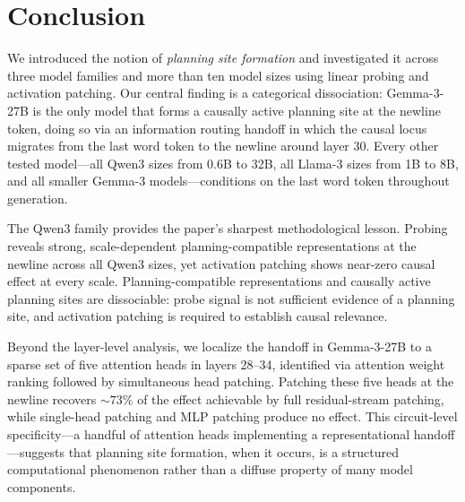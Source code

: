 \documentclass{article}
\begin{document}


\section{Conclusion}

We introduced the notion of \textit{planning site formation} and investigated it across three model families and more than ten model sizes using linear probing and activation patching. Our central finding is a categorical dissociation: Gemma-3-27B is the only model that forms a causally active planning site at the newline token, doing so via an information routing handoff in which the causal locus migrates from the last word token to the newline around layer 30. Every other tested model---all Qwen3 sizes from 0.6B to 32B, all Llama-3 sizes from 1B to 8B, and all smaller Gemma-3 models---conditions on the last word token throughout generation.

The Qwen3 family provides the paper's sharpest methodological lesson. Probing reveals strong, scale-dependent planning-compatible representations at the newline across all Qwen3 sizes, yet activation patching shows near-zero causal effect at every scale. Planning-compatible representations and causally active planning sites are dissociable: probe signal is not sufficient evidence of a planning site, and activation patching is required to establish causal relevance.

Beyond the layer-level analysis, we localize the handoff in Gemma-3-27B to a sparse set of five attention heads in layers 28--34, identified via attention weight ranking followed by simultaneous head patching. Patching these five heads at the newline recovers ${\sim}73\%$ of the effect achievable by full residual-stream patching, while single-head patching and MLP patching produce no effect. This circuit-level specificity---a handful of attention heads implementing a representational handoff---suggests that planning site formation, when it occurs, is a structured computational phenomenon rather than a diffuse property of many model components.
\end{document}
